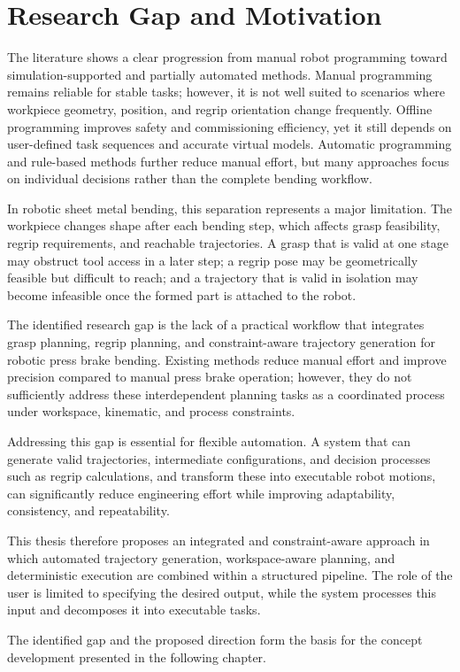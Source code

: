 

\section{Research Gap and Motivation}
\label{sec:research-gap-motivation}

The literature shows a clear progression from manual robot programming toward simulation-supported and partially automated methods. Manual programming remains reliable for stable tasks; however, it is not well suited to scenarios where workpiece geometry, position, and regrip orientation change frequently. Offline programming improves safety and commissioning efficiency, yet it still depends on user-defined task sequences and accurate virtual models. Automatic programming and rule-based methods further reduce manual effort, but many approaches focus on individual decisions rather than the complete bending workflow.

In robotic sheet metal bending, this separation represents a major limitation. The workpiece changes shape after each bending step, which affects grasp feasibility, regrip requirements, and reachable trajectories. A grasp that is valid at one stage may obstruct tool access in a later step; a regrip pose may be geometrically feasible but difficult to reach; and a trajectory that is valid in isolation may become infeasible once the formed part is attached to the robot.

The identified research gap is the lack of a practical workflow that integrates grasp planning, regrip planning, and constraint-aware trajectory generation for robotic press brake bending. Existing methods reduce manual effort and improve precision compared to manual press brake operation; however, they do not sufficiently address these interdependent planning tasks as a coordinated process under workspace, kinematic, and process constraints.

Addressing this gap is essential for flexible automation. A system that can generate valid trajectories, intermediate configurations, and decision processes such as regrip calculations, and transform these into executable robot motions, can significantly reduce engineering effort while improving adaptability, consistency, and repeatability.

This thesis therefore proposes an integrated and constraint-aware approach in which automated trajectory generation, workspace-aware planning, and deterministic execution are combined within a structured pipeline. The role of the user is limited to specifying the desired output, while the system processes this input and decomposes it into executable tasks.

The identified gap and the proposed direction form the basis for the concept development presented in the following chapter.
